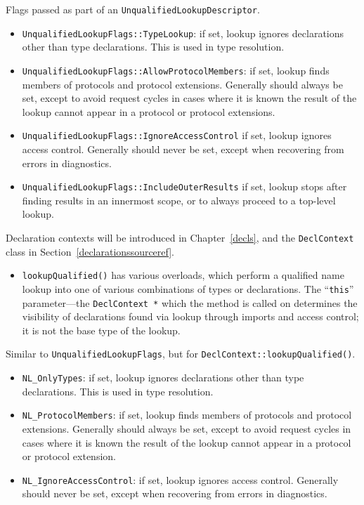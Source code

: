 \documentclass[../generics]{subfiles}
\begin{document}
Flags passed as part of an \texttt{UnqualifiedLookupDescriptor}.
\begin{itemize}
\item \texttt{UnqualifiedLookupFlags::TypeLookup}: if set, lookup ignores declarations other than type declarations. This is used in type resolution.
\item \texttt{UnqualifiedLookupFlags::AllowProtocolMembers}: if set, lookup finds members of protocols and protocol extensions. Generally should always be set, except to avoid request cycles in cases where it is known the result of the lookup cannot appear in a protocol or protocol extensions.
\item \texttt{UnqualifiedLookupFlags::IgnoreAccessControl} if set, lookup ignores access control. Generally should never be set, except when recovering from errors in diagnostics.
\item \texttt{UnqualifiedLookupFlags::IncludeOuterResults} if set, lookup stops after finding results in an innermost scope, or to always proceed to a top-level lookup.
\end{itemize}

Declaration contexts will be introduced in Chapter~\ref{decls}, and the \texttt{DeclContext} class in Section~\ref{declarationssourceref}.
\begin{itemize}
\item \texttt{lookupQualified()} has various overloads, which perform a qualified name lookup into one of various combinations of types or declarations. The ``\texttt{this}'' parameter---the \texttt{DeclContext~*} which the method is called on determines the visibility of declarations found via lookup through imports and access control; it is not the base type of the lookup.
\end{itemize}

Similar to \texttt{UnqualifiedLookupFlags}, but for \texttt{DeclContext::lookupQualified()}.
\begin{itemize}
\item \verb|NL_OnlyTypes|: if set, lookup ignores declarations other than type declarations. This is used in type resolution.
\item \verb|NL_ProtocolMembers|: if set, lookup finds members of protocols and protocol extensions. Generally should always be set, except to avoid request cycles in cases where it is known the result of the lookup cannot appear in a protocol or protocol extension.
\item \verb|NL_IgnoreAccessControl|: if set, lookup ignores access control. Generally should never be set, except when recovering from errors in diagnostics.
\end{itemize}
\end{document}
